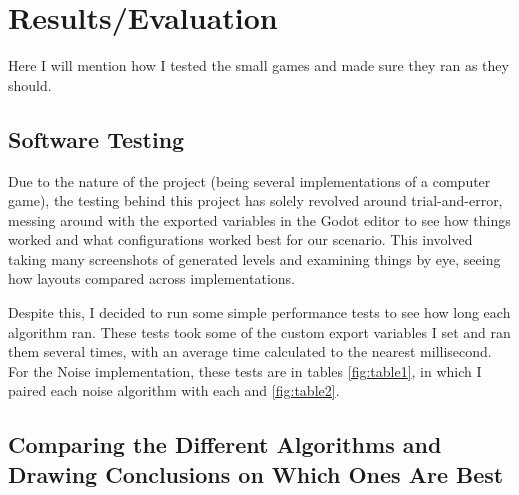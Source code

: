 \chapter{Results/Evaluation} \label{Evaluation}

Here I will mention how I tested the small games and made sure they ran as they should.

\section{Software Testing}

Due to the nature of the project (being several implementations of a computer game), the testing behind this project has solely revolved around trial-and-error, messing around with the exported variables in the Godot editor to see how things worked and what configurations worked best for our scenario. This involved taking many screenshots of generated levels and examining things by eye, seeing how layouts compared across implementations.

Despite this, I decided to run some simple performance tests to see how long each algorithm ran. These tests took some of the custom export variables I set and ran them several times, with an average time calculated to the nearest millisecond. For the Noise implementation, these tests are in tables \ref{fig:table1}, in which I paired each noise algorithm with each  and \ref{fig:table2}.

\section{Comparing the Different Algorithms and Drawing Conclusions on Which Ones Are Best}
